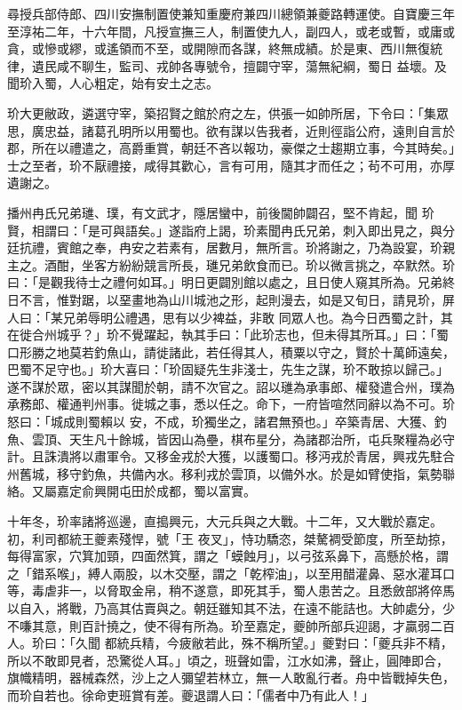 \begin{pinyinscope}
 尋授兵部侍郎、四川安撫制置使兼知重慶府兼四川總領兼夔路轉運使。自寶慶三年至淳祐二年，十六年間，凡授宣撫三人，制置使九人，副四人，或老或暫，或庸或貪，或慘或繆，或遙領而不至，或開隙而各謀，終無成績。於是東、西川無復統律，遺民咸不聊生，監司、戎帥各專號令，擅闢守宰，蕩無紀綱，蜀日
 益壞。及聞玠入蜀，人心粗定，始有安土之志。



 玠大更敝政，遴選守宰，築招賢之館於府之左，供張一如帥所居，下令曰：「集眾思，廣忠益，諸葛孔明所以用蜀也。欲有謀以告我者，近則徑詣公府，遠則自言於郡，所在以禮遣之，高爵重賞，朝廷不吝以報功，豪傑之士趨期立事，今其時矣。」士之至者，玠不厭禮接，咸得其歡心，言有可用，隨其才而任之；茍不可用，亦厚遺謝之。



 播州冉氏兄弟璡、璞，有文武才，隱居蠻中，前後閫帥闢召，堅不肯起，聞
 玠賢，相謂曰：「是可與語矣。」遂詣府上謁，玠素聞冉氏兄弟，刺入即出見之，與分廷抗禮，賓館之奉，冉安之若素有，居數月，無所言。玠將謝之，乃為設宴，玠親主之。酒酣，坐客方紛紛競言所長，璡兄弟飲食而已。玠以微言挑之，卒默然。玠曰：「是觀我待士之禮何如耳。」明日更闢別館以處之，且日使人窺其所為。兄弟終日不言，惟對踞，以堊畫地為山川城池之形，起則漫去，如是又旬日，請見玠，屏人曰：「某兄弟辱明公禮遇，思有以少裨益，非敢
 同眾人也。為今日西蜀之計，其在徙合州城乎？」玠不覺躍起，執其手曰：「此玠志也，但未得其所耳。」曰：「蜀口形勝之地莫若釣魚山，請徙諸此，若任得其人，積粟以守之，賢於十萬師遠矣，巴蜀不足守也。」玠大喜曰：「玠固疑先生非淺士，先生之謀，玠不敢掠以歸己。」遂不謀於眾，密以其謀聞於朝，請不次官之。詔以璡為承事郎、權發遣合州，璞為承務郎、權通判州事。徙城之事，悉以任之。命下，一府皆喧然同辭以為不可。玠怒曰：「城成則蜀賴以
 安，不成，玠獨坐之，諸君無預也。」卒築青居、大獲、釣魚、雲頂、天生凡十餘城，皆因山為壘，棋布星分，為諸郡治所，屯兵聚糧為必守計。且誅潰將以肅軍令。又移金戎於大獲，以護蜀口。移沔戎於青居，興戎先駐合州舊城，移守釣魚，共備內水。移利戎於雲頂，以備外水。於是如臂使指，氣勢聯絡。又屬嘉定俞興開屯田於成都，蜀以富實。



 十年冬，玠率諸將巡邊，直搗興元，大元兵與之大戰。十二年，又大戰於嘉定。初，利司都統王夔素殘悍，號「王
 夜叉」，恃功驕恣，桀驁裯受節度，所至劫掠，每得富家，穴箕加頸，四面然箕，謂之「蟆蝕月」，以弓弦系鼻下，高懸於格，謂之「錯系喉」，縛人兩股，以木交壓，謂之「乾榨油」，以至用醋灌鼻、惡水灌耳口等，毒虐非一，以脅取金帛，稍不遂意，即死其手，蜀人患苦之。且悉斂部將倅馬以自入，將戰，乃高其估賣與之。朝廷雖知其不法，在遠不能詰也。大帥處分，少不嗛其意，則百計撓之，使不得有所為。玠至嘉定，夔帥所部兵迎謁，才贏弱二百人。玠曰：「久聞
 都統兵精，今疲敝若此，殊不稱所望。」夔對曰：「夔兵非不精，所以不敢即見者，恐驚從人耳。」頃之，班聲如雷，江水如沸，聲止，圓陣即合，旗幟精明，器械森然，沙上之人彌望若林立，無一人敢亂行者。舟中皆戰掉失色，而玠自若也。徐命吏班賞有差。夔退謂人曰：「儒者中乃有此人！」




\end{pinyinscope}
